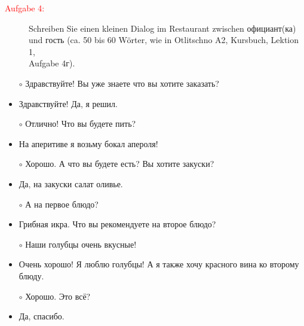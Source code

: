 \documentclass[a4paper]{article}
\theoremstyle{plain}
\begin{document}
\begin{description}
 	\item[\textcolor{red}{Aufgabe 4:}] Schreiben Sie einen kleinen Dialog im Restaurant zwischen официант(ка) und гость (ca. 50 bis 60 Wörter, wie in Otlitschno A2, Kursbuch, Lektion 1,\\ Aufgabe 4г).
\end{description}
\vspace*{1cm}


\begin{itemize}
	\item[$\circ$] Здравствуйте! Вы уже знаете что вы хотите заказать? 
	\item Здравствуйте! Да, я решил.
	\item[$\circ$] Отлично! Что вы будете пить?
	\item На аперитиве я возьму бокал апероля!
	\item[$\circ$] Хорошо. А что вы будете есть? Вы хотите закуски?
	\item Да, на закуски салат оливье.
	\item[$\circ$] А на первое блюдо?
	\item Грибная икра. Что вы рекомендуете на второе блюдо?
	\item[$\circ$] Наши голубцы очень вкусные!
	\item Очень хорошо! Я люблю голубцы! А я также хочу красного вина ко второму блюду.
	\item[$\circ$] Хорошо. Это всё?
	\item Да, спасибо.
\end{itemize}
\end{document}
